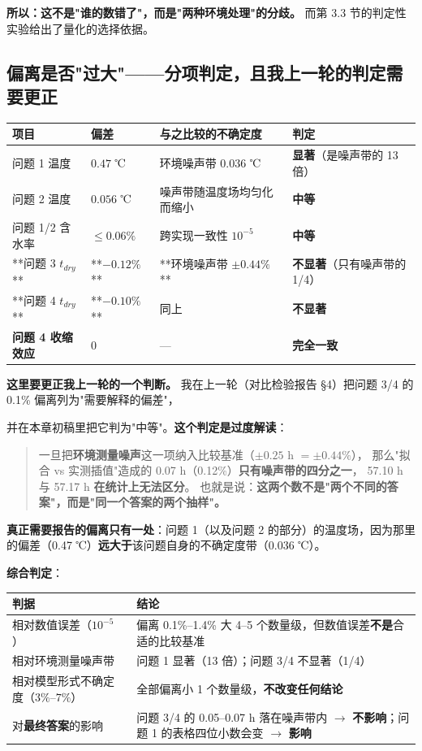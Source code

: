 \textbf{所以：这不是"谁的数错了"，而是"两种环境处理"的分歧。} 而第 3.3 节的判定性实验给出了量化的选择依据。


\subsection{偏离是否"过大"——\textbf{分项判定，且我上一轮的判定需要更正}}


\begin{center}
\small
\begin{tabular}{llll}
\toprule
项目 & 偏差 & 与之比较的不确定度 & 判定 \\
\midrule
问题 1 温度 & $0.47$ ℃ & 环境噪声带 $0.036$ ℃ & \textbf{显著}（是噪声带的 13 倍） \\
问题 2 温度 & $0.056$ ℃ & 噪声带随温度场均匀化而缩小 & \textbf{中等} \\
问题 1/2 含水率 & $\le0.06\%$ & 跨实现一致性 $10^{-5}$ & \textbf{中等} \\
**问题 3 $t_{dry}$** & **$-0.12\%$** & **环境噪声带 $\pm0.44\%$** & \textbf{不显著}（只有噪声带的 1/4） \\
**问题 4 $t_{dry}$** & **$-0.10\%$** & 同上 & \textbf{不显著} \\
\textbf{问题 4 收缩效应} & $0$ & — & \textbf{完全一致} \\
\bottomrule
\end{tabular}
\end{center}


\textbf{这里要更正我上一轮的一个判断。} 我在上一轮（对比检验报告 §4）把问题 3/4 的 0.1\% 偏离列为"需要解释的偏差"，

并在本章初稿里把它判为"中等"。\textbf{这个判定是过度解读}：


\begin{quote}
一旦把\textbf{环境测量噪声}这一项纳入比较基准（$\pm0.25$ h $=\pm0.44\%$）， 那么"拟合 vs 实测插值"造成的 0.07 h（0.12\%）\textbf{只有噪声带的四分之一}， 57.10 h 与 57.17 h \textbf{在统计上无法区分}。  也就是说：\textbf{这两个数不是"两个不同的答案"，而是"同一个答案的两个抽样"。}
\end{quote}


\textbf{真正需要报告的偏离只有一处}：问题 1（以及问题 2 的部分）的温度场，因为那里的偏差（0.47 ℃）\textbf{远大于}该问题自身的不确定度带（0.036 ℃）。


\textbf{综合判定}：


\begin{center}
\small
\begin{tabular}{ll}
\toprule
判据 & 结论 \\
\midrule
相对数值误差（$10^{-5}$） & 偏离 0.1\%–1.4\% 大 4–5 个数量级，但数值误差\textbf{不是}合适的比较基准 \\
相对环境测量噪声带 & 问题 1 显著（13 倍）；问题 3/4 不显著（1/4） \\
相对模型形式不确定度（$3\%$–$7\%$） & 全部偏离小 1 个数量级，\textbf{不改变任何结论} \\
对\textbf{最终答案}的影响 & 问题 3/4 的 0.05–0.07 h 落在噪声带内 $\rightarrow$ \textbf{不影响}；问题 1 的表格四位小数会变 $\rightarrow$ \textbf{影响} \\
\bottomrule
\end{tabular}
\end{center}


